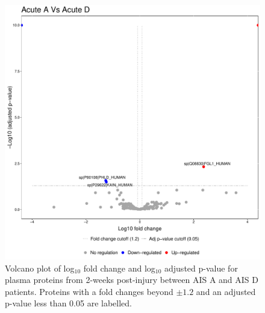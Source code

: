 \documentclass[9pt,lineno]{elife}
\begin{document}
\begin{figure}
\includegraphics[width=1\linewidth]{figures/openms_protein_quantification/label_free/volcano_plots/openms_volcano_plot_2021-08-10_0003} \caption{Volcano plot of log\(_10\) fold change and log\(_10\) adjusted p-value for plasma proteins from 2-weeks post-injury between AIS A and AIS D patients. Proteins with a fold changes beyond \(\pm 1.2\) and an adjusted p-value less than 0.05 are labelled.}\label{fig:volc-plot-acute-a-vs-acute-d}
\end{figure}
\end{document}
